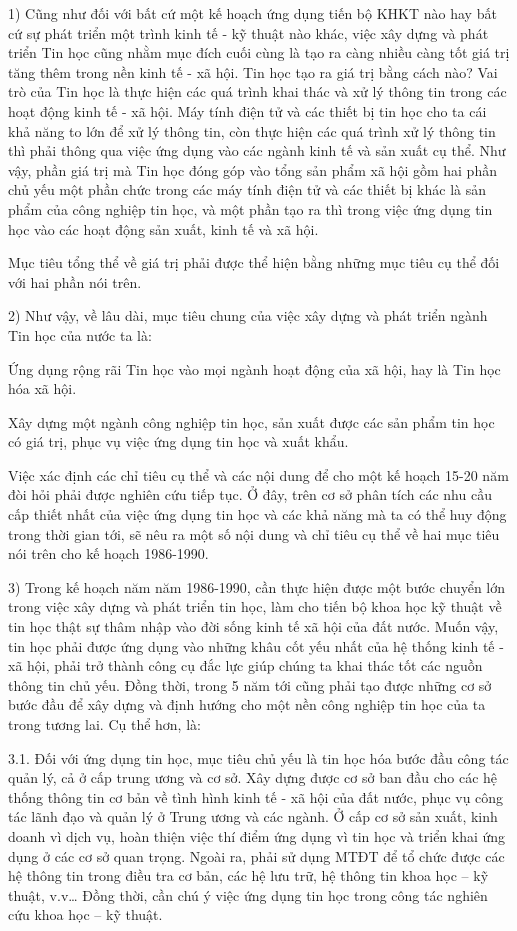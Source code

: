 \documentclass[11pt, a4paper, reqno, oneside]{book}
\begin{document}
1) Cũng như đối với bất cứ một kế hoạch ứng dụng tiến bộ KHKT nào hay bất cứ sự phát triển một trình kinh tế - kỹ thuật nào khác, việc xây dựng và phát triển Tin học cũng nhằm mục đích cuối cùng là tạo ra càng nhiều càng tốt giá trị tăng thêm trong nền kinh tế - xã hội. Tin học tạo ra giá trị bằng cách nào? Vai trò của Tin học là thực hiện các quá trình khai thác và xử lý thông tin trong các hoạt động kinh tế - xã hội. Máy tính điện tử và các thiết bị tin học cho ta cái khả năng to lớn để xử lý thông tin, còn thực hiện các quá trình xử lý thông tin thì phải thông qua việc ứng dụng vào các ngành kinh tế và sản xuất cụ thể. Như vậy, phần giá trị mà Tin học đóng góp vào tổng sản phẩm xã hội gồm hai phần chủ yếu một phần chức trong các máy tính điện tử và các thiết bị khác là sản phẩm của công nghiệp tin học, và một phần tạo ra thì trong việc ứng dụng tin học vào các hoạt động sản xuất, kinh tế và xã hội.


 Mục tiêu tổng thể về giá trị phải được thể hiện bằng những mục tiêu cụ thể đối với hai phần nói trên.
 
 
2) Như vậy, về lâu dài, mục tiêu chung của việc xây dựng và phát triển ngành Tin học của nước ta là:


 Ứng dụng rộng rãi Tin học vào mọi ngành hoạt động của xã hội, hay là Tin học hóa xã hội.
 
 
 Xây dựng một ngành công nghiệp tin học, sản xuất được các sản phẩm tin học có giá trị, phục vụ việc ứng dụng tin học và xuất khẩu.
 
 
 Việc xác định các chỉ tiêu cụ thể và các nội dung để cho một kế hoạch 15-20 năm đòi hỏi phải được nghiên cứu tiếp tục. Ở đây, trên cơ sở phân tích các nhu cầu cấp thiết nhất của việc ứng dụng tin học và các khả năng mà ta có thể huy động trong thời gian tới, sẽ nêu ra một số nội dung và chỉ tiêu cụ thể về hai mục tiêu nói trên cho kế hoạch 1986-1990.
 
 
3) Trong kế hoạch năm năm 1986-1990, cần thực hiện được một bước chuyển lớn trong việc xây dựng và phát triển tin học, làm cho tiến bộ khoa học kỹ thuật về tin học thật sự thâm nhập vào đời sống kinh tế xã hội của đất nước. Muốn vậy, tin học phải được ứng dụng vào những khâu cốt yếu nhất của hệ thống kinh tế - xã hội, phải trở thành công cụ đắc lực giúp chúng ta khai thác tốt các nguồn thông tin chủ yếu. Đồng thời, trong 5 năm tới cũng phải tạo được những cơ sở bước đầu để xây dựng và định hướng cho một nền công nghiệp tin học của ta trong tương lai. Cụ thể hơn, là:


 3.1. Đối với ứng dụng tin học, mục tiêu chủ yếu là tin học hóa bước đầu công tác quản lý, cả ở cấp trung ương và cơ sở. Xây dựng được cơ sở ban đầu cho các hệ thống thông tin cơ bản về tình hình kinh tế - xã hội của đất nước, phục vụ công tác lãnh đạo và quản lý ở Trung ương và các ngành. Ở cấp cơ sở sản xuất, kinh doanh vì dịch vụ, hoàn thiện việc thí điểm ứng dụng vì tin học và triển khai ứng dụng ở các cơ sở quan trọng. Ngoài ra, phải sử dụng MTĐT để tổ chức được các hệ thông tin trong điều tra cơ bản, các hệ lưu trữ, hệ thông tin khoa học – kỹ thuật, v.v… Đồng thời, cần chú ý việc ứng dụng tin học trong công tác nghiên cứu khoa học – kỹ thuật.
 
\end{document}
